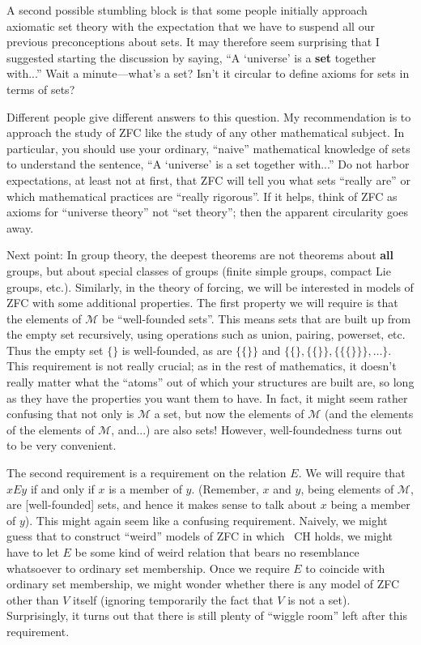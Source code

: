 \documentclass[10pt]{article}
\newcommand\axiom[1]{\textmd{#1}}
\theoremstyle{definition}
\theoremstyle{remark}
\begin{document}
A second possible stumbling block is that some people initially approach axiomatic set theory with the expectation that we have to suspend all our previous preconceptions about sets. It may therefore seem surprising that I suggested starting the discussion by saying, ``A `universe' is a \textbf{set} together with...'' Wait a minute---what's a set? Isn't it circular to define axioms for sets in terms of sets?

Different people give different answers to this question. My recommendation is to approach the study of \axiom{ZFC} like the study of any other mathematical subject. In particular, you should use your ordinary, ``naive'' mathematical knowledge of sets to understand the sentence, ``A `universe' is a set together with...'' Do not harbor expectations, at least not at first, that \axiom{ZFC} will tell you what sets ``really are'' or which mathematical practices are ``really rigorous''. If it helps, think of \axiom{ZFC} as axioms for ``universe theory'' not ``set theory''; then the apparent circularity goes away.

Next point: In group theory, the deepest theorems are not theorems about \textbf{all} groups, but about special classes of groups (finite simple groups, compact Lie groups, etc.). Similarly, in the theory of forcing, we will be interested in models of \axiom{ZFC} with some additional properties. The first property we will require is that the elements of $\mathcal M$ be ``well-founded sets''. This means sets that are built up from the empty set recursively, using operations such as union, pairing, powerset, etc. Thus the empty set $\{\}$ is well-founded, as are $\{\{\}\}$ and $\{\{\}, \{\{\}\}, \{\{\{\}\}\}, \ldots\}$. This requirement is not really crucial; as in the rest of mathematics, it doesn't really matter what the ``atoms'' out of which your structures are built are, so long as they have the properties you want them to have. In fact, it might seem rather confusing that not only is $\mathcal M$ a set, but now the elements of $\mathcal M$ (and the elements of the elements of $\mathcal M$, and...) are also sets! However, well-foundedness turns out to be very convenient.

The second requirement is a requirement on the relation $E$. We will require that $x E y$ if and only if $x$ is a member of $y$. (Remember, $x$ and $y$, being elements of $\mathcal M$, are [well-founded] sets, and hence it makes sense to talk about $x$ being a member of $y$). This might again seem like a confusing requirement. Naively, we might guess that to construct ``weird'' models of \axiom{ZFC} in which \axiom{~CH} holds, we might have to let $E$ be some kind of weird relation that bears no resemblance whatsoever to ordinary set membership. Once we require $E$ to coincide with ordinary set membership, we might wonder whether there is any model of \axiom{ZFC} other than $V$ itself (ignoring temporarily the fact that $V$ is not a set). Surprisingly, it turns out that there is still plenty of ``wiggle room'' left after this requirement.
\end{document}
